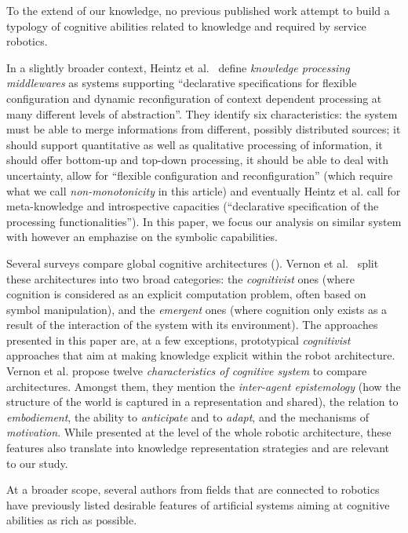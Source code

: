 \documentclass[a4paper, twocolumn]{article}
\begin{document}
To the extend of our knowledge, no previous published work attempt to build a
typology of cognitive abilities related to knowledge and required by service
robotics.

In a slightly broader context, Heintz et al.~\cite{Heintz2008} define
\emph{knowledge processing middlewares} as systems supporting ``declarative
specifications for flexible configuration and dynamic reconfiguration of
context dependent processing at many different levels of abstraction''. They
identify six characteristics: the system must be able to merge informations
from different, possibly distributed sources; it should support quantitative as
well as qualitative processing of information, it should offer bottom-up and
top-down processing, it should be able to deal with uncertainty, allow for
``flexible configuration and reconfiguration'' (which require what we call
\emph{non-monotonicity} in this article) and eventually Heintz et al. call for
meta-knowledge and introspective capacities (``declarative specification of the
processing functionalities''). In this paper, we focus our analysis on similar
system with however an emphazise on the symbolic capabilities.

Several surveys compare global cognitive architectures (\cite{Vernon2007, Chong2009}).
Vernon et al.~\cite{Vernon2007} split these architectures into two broad
categories: the \emph{cognitivist} ones (where cognition is considered as an
explicit computation problem, often based on symbol manipulation), and the
\emph{emergent} ones (where cognition only exists as a result of the
interaction of the system with its environment). The approaches presented in
this paper are, at a few exceptions, prototypical \emph{cognitivist} approaches
that aim at making knowledge explicit within the robot architecture. Vernon et
al. propose twelve \emph{characteristics of cognitive system} to compare
architectures. Amongst them, they mention the \emph{inter-agent epistemology} (how
the structure of the world is captured in a representation and shared), the
relation to \emph{embodiement}, the ability to \emph{anticipate} and to
\emph{adapt}, and the mechanisms of \emph{motivation}. While presented at the
level of the whole robotic architecture, these features also translate into
knowledge representation strategies and are relevant to our study.

At a broader scope, several authors from fields that are connected to robotics
have previously listed desirable features of artificial systems aiming at
cognitive abilities as rich as possible.
\end{document}
